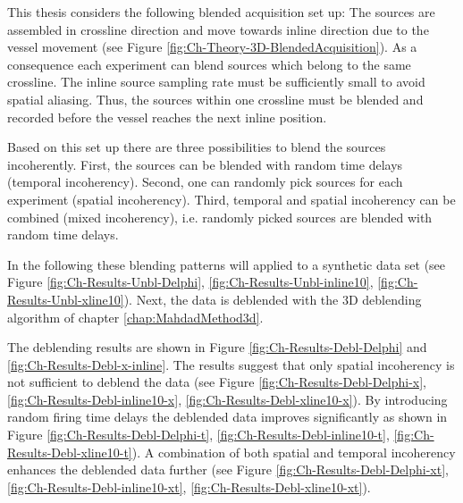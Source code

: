 This thesis considers the following blended acquisition set up: The sources are assembled in crossline direction and move towards inline direction due to the vessel movement (see Figure \ref{fig:Ch-Theory-3D-BlendedAcquisition}). As a consequence each experiment can blend sources which belong to the same crossline. The inline source sampling rate must be sufficiently small to avoid spatial aliasing. Thus, the sources within one crossline must be blended and recorded before the vessel reaches the next inline position.

Based on this set up there are three possibilities to blend the sources incoherently. First, the sources can be blended with random time delays (temporal incoherency). Second, one can randomly pick sources for each experiment (spatial incoherency). Third, temporal and spatial incoherency can be combined (mixed incoherency), i.e. randomly picked sources are blended with random time delays.

In the following these blending patterns will applied to a synthetic data set (see Figure \ref{fig:Ch-Results-Unbl-Delphi}, \ref{fig:Ch-Results-Unbl-inline10}, \ref{fig:Ch-Results-Unbl-xline10}). Next, the data is deblended with the 3D deblending algorithm of chapter \ref{chap:MahdadMethod3d}. 

The deblending results are shown in Figure \ref{fig:Ch-Results-Debl-Delphi} and \ref{fig:Ch-Results-Debl-x-inline}. The results suggest that only spatial incoherency is not sufficient to deblend the data (see Figure \ref{fig:Ch-Results-Debl-Delphi-x}, \ref{fig:Ch-Results-Debl-inline10-x}, \ref{fig:Ch-Results-Debl-xline10-x}). By introducing random firing time delays the deblended data improves significantly as shown in Figure \ref{fig:Ch-Results-Debl-Delphi-t}, \ref{fig:Ch-Results-Debl-inline10-t}, \ref{fig:Ch-Results-Debl-xline10-t}). A combination of both spatial and temporal incoherency enhances the deblended data further (see Figure \ref{fig:Ch-Results-Debl-Delphi-xt}, \ref{fig:Ch-Results-Debl-inline10-xt}, \ref{fig:Ch-Results-Debl-xline10-xt}).

